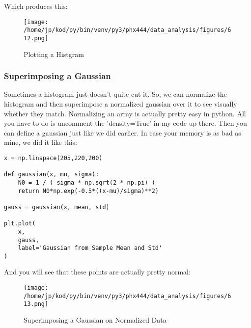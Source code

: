 \documentclass{article}
\begin{document}
Which produces this:

\begin{figure}[H]
        \begin{center}
        \texttt{[image: /home/jp/kod/py/bin/venv/py3/phx444/data\_analysis/figures/612.png]}
        \caption{Plotting a Histgram}
        \label{fig:fig_14}
        \end{center}
\end{figure}

\subsubsection{Superimposing a Gaussian}
Sometimes a histogram just doesn't quite cut it. So, we can normalize the
histogram and then superimpose a normalized gaussian over it to see visually
whether they match. Normalizing an array is actually pretty easy in python. All
you have to do is uncomment the 'density=True' in my code up there. Then you
can define a gaussian just like we did earlier. In case your memory is as bad
as mine, we did it like this:

\begin{center}
\begin{minipage}[t]{.80\textwidth}
\begin{lstlisting}[frame=tlrb]
x = np.linspace(205,220,200)

def gaussian(x, mu, sigma):
    N0 = 1 / ( sigma * np.sqrt(2 * np.pi) )
    return N0*np.exp(-0.5*((x-mu)/sigma)**2)

gauss = gaussian(x, mean, std)

plt.plot(
    x,
    gauss,
    label='Gaussian from Sample Mean and Std'
)
\end{lstlisting}
\end{minipage}
\end{center}

And you will see that these points are actually pretty normal:
\begin{figure}[H]
        \begin{center}
        \texttt{[image: /home/jp/kod/py/bin/venv/py3/phx444/data\_analysis/figures/613.png]}
        \caption{Superimposing a Gaussian on Normalized Data}
        \label{fig:fig_15}
        \end{center}
\end{figure}
\end{document}
